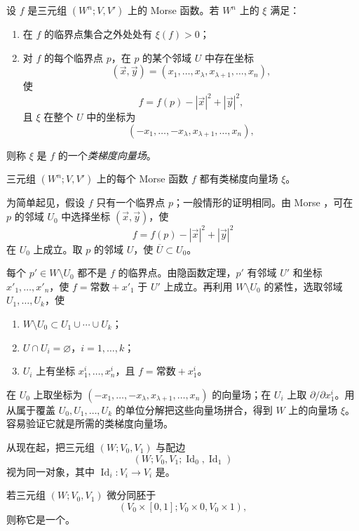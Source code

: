 
设 $f$ 是三元组 $(W^n;V,V')$ 上的 Morse 函数。若 $W^n$ 上的 $\xi$ 满足：
\begin{enumerate}[label=(\Roman*)]
  \item 在 $f$ 的临界点集合之外处处有 $\xi(f)>0$；
  \item 对 $f$ 的每个临界点 $p$，在 $p$ 的某个邻域 $U$ 中存在坐标
  \[
    (\vec x,\vec y)=(x_1,\ldots,x_\lambda,x_{\lambda+1},\ldots,x_n),
  \]
  使
  \[
    f=f(p)-|\vec x|^2+|\vec y|^2,
  \]
  且 $\xi$ 在整个 $U$ 中的坐标为
  \[
    (-x_1,\ldots,-x_\lambda,x_{\lambda+1},\ldots,x_n),
  \]
\end{enumerate}
则称 $\xi$ 是 $f$ 的一个\emph{类梯度向量场}。

三元组 $(W^n;V,V')$ 上的每个 Morse 函数 $f$ 都有类梯度向量场 $\xi$。

\Proof 为简单起见，假设 $f$ 只有一个临界点 $p$；一般情形的证明相同。由 Morse ，可在 $p$ 的邻域 $U_0$ 中选择坐标 $(\vec x,\vec y)$，使
\[
  f=f(p)-|\vec x|^2+|\vec y|^2
\]
在 $U_0$ 上成立。取 $p$ 的邻域 $U$，使 $\overline U\subset U_0$。

每个 $p'\in W\setminus U_0$ 都不是 $f$ 的临界点。由隐函数定理，$p'$ 有邻域 $U'$ 和坐标 $x'_1,\ldots,x'_n$，使 $f=\text{常数}+x'_1$ 于 $U'$ 上成立。再利用 $W\setminus U_0$ 的紧性，选取邻域 $U_1,\ldots,U_k$，使
\begin{enumerate}[label=(\roman*)]
  \item $W\setminus U_0\subset U_1\cup\cdots\cup U_k$；
  \item $U\cap U_i=\varnothing$，$i=1,\ldots,k$；
  \item $U_i$ 上有坐标 $x^i_1,\ldots,x^i_n$，且 $f=\text{常数}+x^i_1$。
\end{enumerate}
在 $U_0$ 上取坐标为 $(-x_1,\ldots,-x_\lambda,x_{\lambda+1},\ldots,x_n)$ 的向量场；在 $U_i$ 上取 $\partial/\partial x^i_1$。用从属于覆盖 $U_0,U_1,\ldots,U_k$ 的单位分解把这些向量场拼合，得到 $W$ 上的向量场 $\xi$。容易验证它就是所需的类梯度向量场。
\EndProof

\Remark 从现在起，把三元组 $(W;V_0,V_1)$ 与配边
\[
  (W;V_0,V_1;\operatorname{Id}_0,\operatorname{Id}_1)
\]
视为同一对象，其中 $\operatorname{Id}_i:V_i\to V_i$ 是。

若三元组 $(W;V_0,V_1)$ 微分同胚于
\[
  (V_0\times[0,1];V_0\times0,V_0\times1),
\]
则称它是一个\emph{}。

